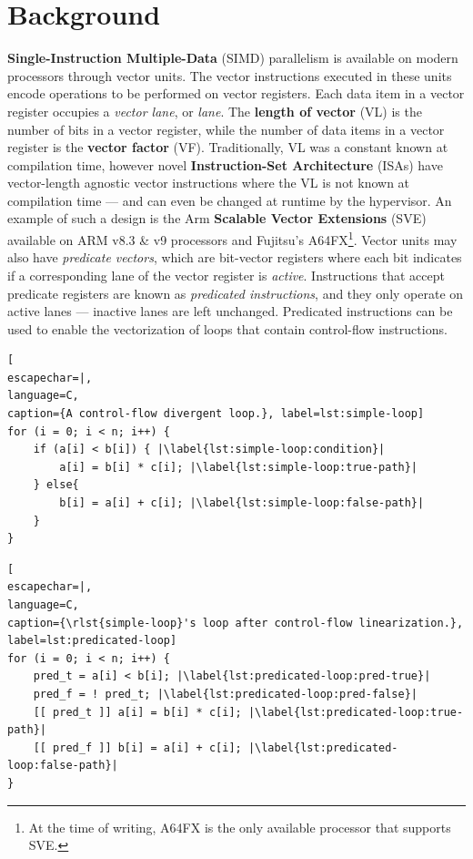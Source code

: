 \section{Background}
\label{sec:background}

\textbf{Single-Instruction Multiple-Data} (SIMD) parallelism is available on modern processors through vector units.
The vector instructions executed in these units encode operations to be performed on vector registers.
Each data item in a vector register occupies a \emph{vector lane}, or \emph{lane}.
The \textbf{length  of vector} (VL) is the number of bits in a vector register, while the number of data items in a vector register is the \textbf{vector factor} (VF).
Traditionally, VL was a constant known at compilation time, however novel \textbf{Instruction-Set Architecture} (ISAs) have vector-length agnostic vector instructions where the VL is not known at compilation time --- and can even be changed at runtime by the hypervisor.
An example of such a design is the Arm \textbf{Scalable Vector Extensions} (SVE) available on ARM v8.3 \& v9 processors and Fujitsu's A64FX\footnote{At the time of writing, A64FX is the only available processor that supports SVE.}.
Vector units may also have \emph{predicate vectors}, 
 which are bit-vector registers where each bit indicates if a corresponding lane of the vector register is \emph{active}.
Instructions that accept predicate registers are known as \emph{predicated instructions}, and they only operate on active lanes --- inactive lanes are left unchanged.
Predicated instructions can be used to enable the vectorization of loops that contain control-flow instructions.

\begin{center}
\begin{minipage}[t]{0.8\columnwidth}
\begin{lstlisting}[
escapechar=|,
language=C,
caption={A control-flow divergent loop.}, label=lst:simple-loop]
for (i = 0; i < n; i++) {
    if (a[i] < b[i]) { |\label{lst:simple-loop:condition}|
        a[i] = b[i] * c[i]; |\label{lst:simple-loop:true-path}|
    } else{
        b[i] = a[i] + c[i]; |\label{lst:simple-loop:false-path}|
    }
}
\end{lstlisting}
\end{minipage}
\end{center}

\iffalse
\begin{lstlisting}[
escapechar=|,
language=C,
caption={\rlst{simple-loop}'s loop after control-flow linearization.}, label=lst:predicated-loop]
for (i = 0; i < n; i++) {
    pred_t = a[i] < b[i]; |\label{lst:predicated-loop:pred-true}|
    pred_f = ! pred_t; |\label{lst:predicated-loop:pred-false}|
    [[ pred_t ]] a[i] = b[i] * c[i]; |\label{lst:predicated-loop:true-path}|
    [[ pred_f ]] b[i] = a[i] + c[i]; |\label{lst:predicated-loop:false-path}|
}
\end{lstlisting}

